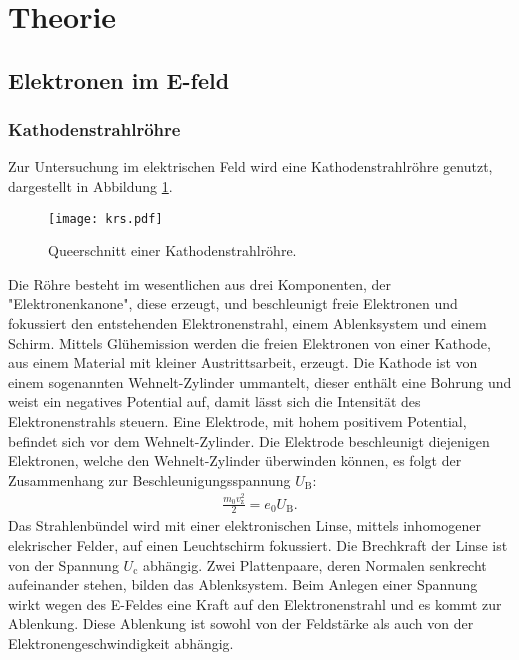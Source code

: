 \section{Theorie}
\label{sec:Theorie}
\subsection{Elektronen im E-feld}
\subsubsection{Kathodenstrahlröhre}
Zur Untersuchung im elektrischen Feld wird eine Kathodenstrahlröhre genutzt,
dargestellt in Abbildung \ref{fig:krs}.
\begin{figure}
 \centering
 \texttt{[image: krs.pdf]}
 \caption{Queerschnitt einer Kathodenstrahlröhre.}
 \label{fig:krs}
\end{figure}
Die Röhre besteht im wesentlichen aus drei Komponenten, der "Elektronenkanone",
diese erzeugt, und beschleunigt freie Elektronen und
fokussiert den entstehenden Elektronenstrahl, einem Ablenksystem und einem Schirm.
Mittels Glühemission werden die freien Elektronen von einer Kathode, aus
einem Material mit kleiner Austrittsarbeit, erzeugt.
Die Kathode ist von einem sogenannten Wehnelt-Zylinder ummantelt, dieser enthält
eine Bohrung und weist ein negatives Potential auf, damit lässt sich die
Intensität des Elektronenstrahls steuern.
Eine Elektrode, mit hohem positivem Potential, befindet sich
vor dem Wehnelt-Zylinder. Die Elektrode beschleunigt diejenigen Elektronen,
welche den Wehnelt-Zylinder überwinden können, es folgt der Zusammenhang zur Beschleunigungsspannung $U_\mathrm{B}$:
\begin{align}
  \frac{m_\mathrm{0}v_\mathrm{z}^{2}}{2}=e_\mathrm{0}U_\mathrm{B} \label{eqn:beschleunigung}.
\end{align}
Das Strahlenbündel wird mit einer elektronischen Linse, mittels
inhomogener elekrischer Felder, auf einen Leuchtschirm fokussiert.
Die Brechkraft der Linse ist von der Spannung $U_\mathrm{c}$ abhängig.
Zwei Plattenpaare, deren Normalen senkrecht aufeinander stehen, bilden
das Ablenksystem. Beim Anlegen einer Spannung wirkt wegen des E-Feldes
eine Kraft auf den Elektronenstrahl und es kommt zur Ablenkung.
Diese Ablenkung ist sowohl von der Feldstärke als auch von der
Elektronengeschwindigkeit abhängig.

